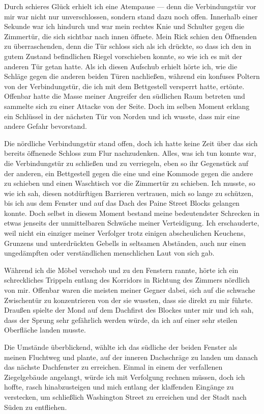 Durch schieres Glück erhielt ich eine Atempause --- denn die Verbindungstür vor mir war nicht nur unverschlossen, sondern stand dazu noch offen. Innerhalb einer Sekunde war ich hindurch und war mein rechtes Knie und Schulter gegen die Zimmertür, die sich sichtbar nach innen öffnete. Mein Rick schien den Öffnenden zu überraschenden, denn die Tür schloss sich als ich drückte, so dass ich den in gutem Zustand befindlichen Riegel vorschieben konnte, so wie ich es mit der anderen Tür getan hatte. Als ich diesen Aufschub erhielt hörte ich, wie die Schläge gegen die anderen beiden Türen nachließen, während ein konfuses Poltern von der Verbindungstür, die ich mit dem Bettgestell versperrt hatte, ertönte. Offenbar hatte die Masse meiner Angreifer den südlichen Raum betreten und sammelte sich zu einer Attacke von der Seite. Doch im selben Moment erklang ein Schlüssel in der nächsten Tür von Norden und ich wusste, dass mir eine andere Gefahr bevorstand.

Die nördliche Verbindungstür stand offen, doch ich hatte keine Zeit über das sich bereits öffnenede Schloss zum Flur nachzudenken. Alles, was ich tun konnte war, die Verbindungstür zu schließen und zu verriegeln, eben so ihr Gegenstück auf der anderen, ein Bettgestell gegen die eine und eine Kommode gegen die andere zu schieben und einen  Waschtisch vor die Zimmertür zu schieben. Ich musste, so wie ich sah, diesen notdürftigen Barrieren vertrauen, mich so lange zu schützen, bis ich aus dem Fenster und auf das Dach des Paine Street Blocks gelangen konnte. Doch selbst in diesem Moment bestand meine bedeutendster Schrecken in etwas jenseits der unmittelbaren Schwäche meiner Verteidigung. Ich erschauderte, weil nicht ein einziger meiner Verfolger trotz einigen abscheulichen Keuchens, Grunzens und unterdrückten Gebells in seltsamen Abständen, auch nur einen ungedämpften oder verständlichen menschlichen Laut von sich gab.

Während ich die Möbel verschob und zu den Fenstern rannte, hörte ich ein schreckliches Trippeln entlang des Korridors in Richtung des Zimmers nördlich von mir. Offenbar waren die meisten meiner Gegner dabei, sich auf die schwache Zwischentür zu konzentrieren von der sie wussten, dass sie direkt zu mir führte. Draußen spielte der Mond auf dem Dachfirst des Blockes unter mir und ich sah, dass der Sprung sehr gefährlich werden würde, da ich auf einer sehr steilen Oberfläche landen musste.

Die Umstände überblickend, wählte ich das südliche der beiden Fenster als meinen Fluchtweg und plante, auf der inneren Dachschräge zu landen um danach das nächste Dachfenster zu erreichen. Einmal in einem der verfallenen Ziegelgebäude angelangt, würde ich mit Verfolgung rechnen müssen, doch ich hoffte, rasch hinabzusteigen und mich entlang der klaffenden Eingänge zu verstecken, um schließlich Washington Street zu erreichen und der Stadt nach Süden zu entfliehen.

